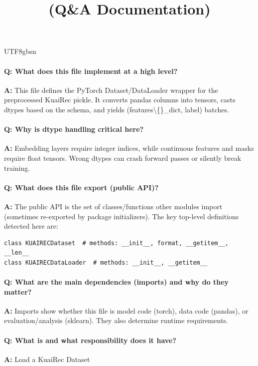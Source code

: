 \documentclass[11pt]{article}
\title{\texttt{\detokenize{dataloader/kuairec.py}} (Q\&A Documentation)}
\author{}
\date{}
\begin{document}
\begin{CJK*}{UTF8}{gbsn}
\maketitle

\paragraph{Q: What does this file implement at a high level?}
\textbf{A:} This file defines the PyTorch Dataset/DataLoader wrapper for the preprocessed KuaiRec pickle. It converts pandas columns into tensors, casts dtypes based on the schema, and yields (features\textbackslash\{\}\_dict, label) batches.

\paragraph{Q: Why is dtype handling critical here?}
\textbf{A:} Embedding layers require integer indices, while continuous features and masks require float tensors. Wrong dtypes can crash forward passes or silently break training.

\paragraph{Q: What does this file export (public API)?}
\textbf{A:} The public API is the set of classes/functions other modules import (sometimes re-exported by package initializers). The key top-level definitions detected here are:

\begin{Verbatim}[fontsize=\small]
class KUAIRECDataset  # methods: __init__, format, __getitem__, __len__
class KUAIRECDataLoader  # methods: __init__, __getitem__
\end{Verbatim}

\paragraph{Q: What are the main dependencies (imports) and why do they matter?}
\textbf{A:} Imports show whether this file is model code (torch), data code (pandas), or evaluation/analysis (sklearn). They also determine runtime requirements.

\vspace{1mm}


\paragraph{Q: What is \texttt{} and what responsibility does it have?}
\textbf{A:} Load a KuaiRec Dataset


\end{CJK*}
\end{document}
